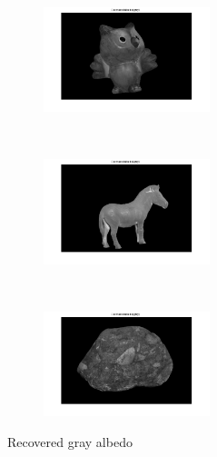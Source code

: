 \documentclass{paper}
\begin{document}
\begin{figure}[h!]
\begin{subfigure}[]{0.33\textwidth}
        \centering
        \includegraphics[height=1.2in]{owlGA}
    \end{subfigure}%
    ~ 
    \begin{subfigure}[]{0.33\textwidth}
        \centering
        \includegraphics[height=1.2in]{zebraGA}
    \end{subfigure}%
    ~ 
    \begin{subfigure}[]{0.33\textwidth}
        \centering
        \includegraphics[height=1.2in]{rockGA}
    \end{subfigure}

    \caption{Recovered gray albedo}    
\end{figure}
\end{document}
